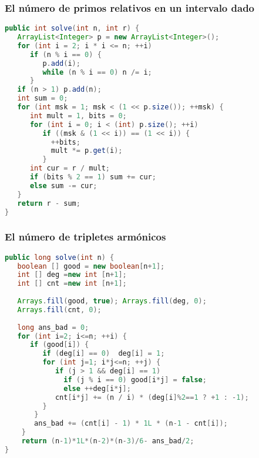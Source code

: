 \subsubsection{El número de primos relativos en un intervalo dado}
\begin{lstlisting}[language=Java]
public int solve(int n, int r) {
   ArrayList<Integer> p = new ArrayList<Integer>();
   for (int i = 2; i * i <= n; ++i)
      if (n % i == 0) {
         p.add(i);
         while (n % i == 0) n /= i;
      }
   if (n > 1) p.add(n);
   int sum = 0;
   for (int msk = 1; msk < (1 << p.size()); ++msk) {
      int mult = 1, bits = 0;
      for (int i = 0; i < (int) p.size(); ++i)
         if ((msk & (1 << i)) == (1 << i)) {
           ++bits;
           mult *= p.get(i);
	     }
      int cur = r / mult;
      if (bits % 2 == 1) sum += cur;
      else sum -= cur;
   }
   return r - sum;
}
\end{lstlisting} 

\subsubsection{El número de tripletes armónicos}
\begin{lstlisting}[language=Java]
public long solve(int n) {
   boolean [] good = new boolean[n+1];
   int [] deg =new int [n+1];
   int [] cnt =new int [n+1];
	
   Arrays.fill(good, true); Arrays.fill(deg, 0);
   Arrays.fill(cnt, 0);
	
   long ans_bad = 0;
   for (int i=2; i<=n; ++i) {
      if (good[i]) {
         if (deg[i] == 0)  deg[i] = 1;
         for (int j=1; i*j<=n; ++j) {
            if (j > 1 && deg[i] == 1)
              if (j % i == 0) good[i*j] = false;
              else ++deg[i*j];
            cnt[i*j] += (n / i) * (deg[i]%2==1 ? +1 : -1);
         }
       }
       ans_bad += (cnt[i] - 1) * 1L * (n-1 - cnt[i]);
    }
    return (n-1)*1L*(n-2)*(n-3)/6- ans_bad/2;
}
\end{lstlisting}